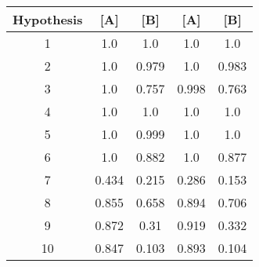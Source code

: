\begin{tabular}{c|cccc}
Hypothesis & [A] & [B] & [A] & [B] \\
\hline
1 & 1.0 & 1.0 & 1.0 & 1.0 \\
2 & 1.0 & 0.979 & 1.0 & 0.983 \\
3 & 1.0 & 0.757 & 0.998 & 0.763 \\
4 & 1.0 & 1.0 & 1.0 & 1.0 \\
5 & 1.0 & 0.999 & 1.0 & 1.0 \\
6 & 1.0 & 0.882 & 1.0 & 0.877 \\
7 & 0.434 & 0.215 & 0.286 & 0.153 \\
8 & 0.855 & 0.658 & 0.894 & 0.706 \\
9 & 0.872 & 0.31 & 0.919 & 0.332 \\
10 & 0.847 & 0.103 & 0.893 & 0.104 \\
\end{tabular}